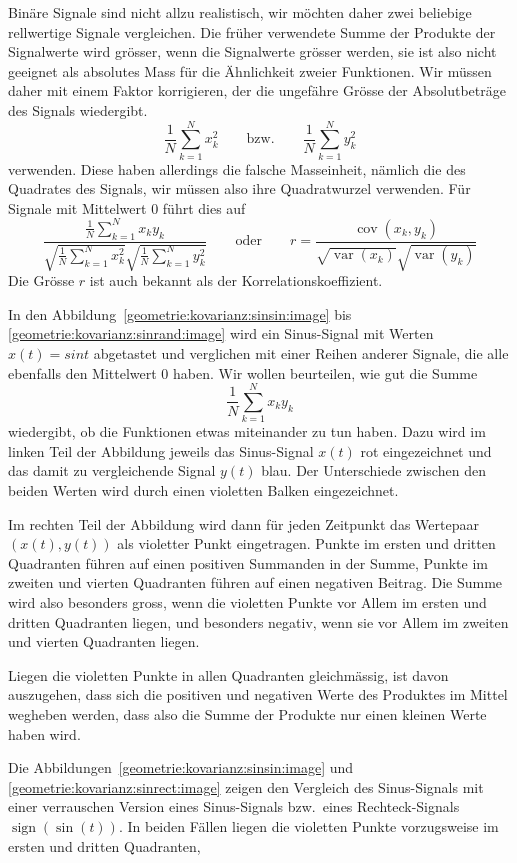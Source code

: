 Binäre Signale sind nicht allzu realistisch, wir möchten daher zwei
beliebige rellwertige Signale vergleichen.
Die früher verwendete Summe der Produkte der Signalwerte wird grösser,
wenn die Signalwerte grösser werden, sie ist also nicht geeignet als
absolutes Mass für die Ähnlichkeit zweier Funktionen.
Wir müssen daher mit einem Faktor korrigieren, der die ungefähre
Grösse der Absolutbeträge des Signals wiedergibt.
\[
\frac1{N}
\sum_{k=1}^N x_k^2
\qquad\text{bzw.}\qquad
\frac1{N}
\sum_{k=1}^N y_k^2
\]
verwenden.
Diese haben allerdings die falsche Masseinheit, nämlich die des
Quadrates des Signals, wir müssen also ihre Quadratwurzel verwenden.
Für Signale mit Mittelwert $0$ führt dies auf
\[
\frac{
\frac{1}{N}\sum_{k=1}^N x_ky_k
}{
\sqrt{\frac{1}{N}\sum_{k=1}^N x_k^2}
\sqrt{\frac{1}{N}\sum_{k=1}^N y_k^2}
}
\qquad\text{oder}\qquad
r
=
\frac{\operatorname{cov}(x_k,y_k)}{\sqrt{\operatorname{var}(x_k)}\sqrt{\operatorname{var}(y_k)}}
\]
Die Grösse $r$ ist auch bekannt als der Korrelationskoeffizient.

In den Abbildung~\ref{geometrie:kovarianz:sinsin:image} bis
\ref{geometrie:kovarianz:sinrand:image} wird ein Sinus-Signal
mit Werten $x(t)=sin t$ abgetastet und verglichen mit
einer Reihen anderer Signale,
die alle ebenfalls den Mittelwert $0$ haben.
Wir wollen beurteilen, wie gut die Summe
\[
\frac{1}{N}\sum_{k=1}^N x_ky_k
\]
wiedergibt, ob die Funktionen etwas miteinander zu tun haben.
Dazu wird im linken Teil der Abbildung jeweils das Sinus-Signal
$x(t)$ rot eingezeichnet und das damit zu vergleichende Signal $y(t)$
blau.
Der Unterschiede zwischen den beiden Werten wird durch einen 
violetten Balken eingezeichnet.

Im rechten Teil der Abbildung wird dann für jeden Zeitpunkt
das Wertepaar $(x(t),y(t))$ als violetter Punkt eingetragen.
Punkte im ersten und dritten Quadranten führen auf einen positiven
Summanden in der Summe, Punkte im zweiten und vierten Quadranten
führen auf einen negativen Beitrag.
Die Summe wird also besonders gross, wenn die violetten Punkte vor
Allem im ersten und dritten Quadranten liegen, und besonders negativ,
wenn sie vor Allem im zweiten und vierten Quadranten liegen.

Liegen die violetten Punkte in allen Quadranten gleichmässig, ist
davon auszugehen, dass sich die positiven und negativen Werte des
Produktes im Mittel wegheben werden, dass also die Summe der
Produkte nur einen kleinen Werte haben wird.

Die Abbildungen~\ref{geometrie:kovarianz:sinsin:image} und
\ref{geometrie:kovarianz:sinrect:image} zeigen den Vergleich
des Sinus-Signals mit einer verrauschen Version eines Sinus-Signals
bzw.~eines Rechteck-Signals $\operatorname{sign}(\sin(t))$.
In beiden Fällen liegen die violetten Punkte vorzugsweise im ersten
und dritten Quadranten, 

